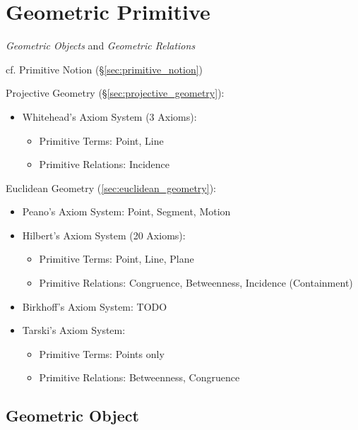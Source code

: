 \section{Geometric Primitive}\label{sec:geometric_primitive}

\emph{Geometric Objects} and \emph{Geometric Relations}

cf. Primitive Notion (\S\ref{sec:primitive_notion})

Projective Geometry (\S\ref{sec:projective_geometry}):
\begin{itemize}
  \item Whitehead's Axiom System (3 Axioms):
    \begin{itemize}
      \item Primitive Terms: Point, Line
      \item Primitive Relations: Incidence
    \end{itemize}
\end{itemize}

Euclidean Geometry (\ref{sec:euclidean_geometry}):
\begin{itemize}
  \item Peano's Axiom System: Point, Segment, Motion
  \item Hilbert's Axiom System (20 Axioms):
    \begin{itemize}
      \item Primitive Terms: Point, Line, Plane
      \item Primitive Relations: Congruence, Betweenness,
        Incidence (Containment)
    \end{itemize}
  \item Birkhoff's Axiom System: TODO
  \item Tarski's Axiom System:
    \begin{itemize}
      \item Primitive Terms: Points only
      \item Primitive Relations: Betweenness, Congruence
    \end{itemize}
\end{itemize}



\subsection{Geometric Object}\label{sec:geometric_object}

